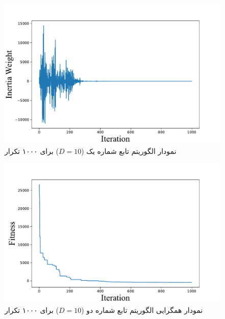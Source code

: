  \begin{figure}[H]\label{fig:ring}
	\caption{نمودار  الگوریتم  تابع شماره یک ($D=10$) برای ۱۰۰۰ تکرار } 
	\centering 
	\includegraphics[width=16cm]{../Figure/Q1/PSO_inertia_weight} 
\end{figure}

 \begin{figure}[H]\label{fig:ring}
	\caption{نمودار همگرایی الگوریتم  تابع شماره دو ($D=10$) برای ۱۰۰۰ تکرار } 
	\centering 
	\includegraphics[width=16cm]{../Figure/Q1/PSO_II_convergence_curve} 
\end{figure}

